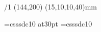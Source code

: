 \chyph  %





\margins/1 (144,200) (15,10,10,40)mm

\typosize[10/15]

\def\pagenumbers{\footline{\hss\tenrm\folio\hss}}

\def\picdir {./Obrazky/}

\font\nadpis=csssdc10  at30pt
\font\telo=csssdc10 

\def\atd {...}
